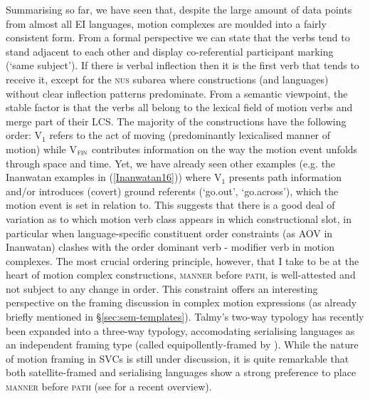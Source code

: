 Summarising so far, we have seen that, despite the large amount of data points from almost all EI languages, motion complexes are moulded into a fairly consistent form. From a formal perspective we can state that the verbs tend to stand adjacent to each other and display co-referential participant marking (`same subject'). If there is verbal inflection then it is the first verb that tends to receive it, except for the \textsc{nus} subarea where constructions (and languages) without clear inflection patterns predominate. From a semantic viewpoint, the stable factor is that the verbs all belong to the lexical field of motion verbs and merge part of their LCS. The majority of the constructions have the following order: V$_{1}$ refers to the act of moving (predominantly lexicalised manner of motion) while V$_{\textsc{fin}}$ contributes information on the way the motion event unfolds through space and time. Yet, we have already seen other examples (e.g. the Inanwatan examples in (\ref{Inanwatan16})) where V$_{1}$ presents path information and/or introduces (covert) ground referents (`go.out', `go.across'), which the motion event is set in relation to. This suggests that there is a good deal of variation as to which motion verb class appears in which constructional slot, in particular when language-specific constituent order constraints (as AOV in Inanwatan) clashes with the order dominant verb - modifier verb in motion complexes. The most crucial ordering principle, however, that I take to be at the heart of motion complex constructions, \textsc{manner} before \textsc{path}, is well-attested and not subject to any change in order. This constraint offers an interesting perspective on the framing discussion in complex motion expressions (as already briefly mentioned in §\ref{sec:sem-templates}). Talmy's two-way typology \citep{talmy1985lexicalization, talmy2000toward} has recently been expanded into a three-way typology, accomodating serialising languages as an independent framing type (called equipollently-framed by \citealt{slobin2004many}). While the nature of motion framing in SVCs is still under discussion, it is quite remarkable that both satellite-framed and serialising languages show a strong preference to place \textsc{manner} before \textsc{path} (see \citealt{Ameka2013} for a recent overview).

